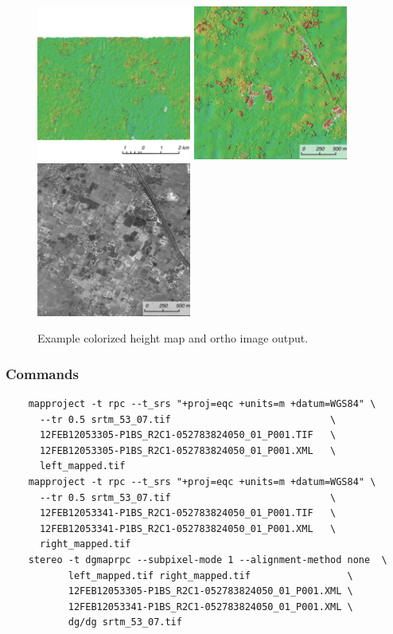 \begin{figure}[h!]
\centering
  \includegraphics[width=2.0in]{images/examples/dg/MappedContext_400px.png}
  \includegraphics[width=2.0in]{images/examples/dg/MappedCloseUp_400px.png}
  \includegraphics[width=2.0in]{images/examples/dg/MappedCloseUpDRG_400px.png}
\caption{Example colorized height map and ortho image output.}
\label{fig:dg-map-example}
\end{figure}

\subsubsection*{Commands}

\begin{verbatim}
    mapproject -t rpc --t_srs "+proj=eqc +units=m +datum=WGS84" \
      --tr 0.5 srtm_53_07.tif                            \
      12FEB12053305-P1BS_R2C1-052783824050_01_P001.TIF   \
      12FEB12053305-P1BS_R2C1-052783824050_01_P001.XML   \
      left_mapped.tif
    mapproject -t rpc --t_srs "+proj=eqc +units=m +datum=WGS84" \
      --tr 0.5 srtm_53_07.tif                            \
      12FEB12053341-P1BS_R2C1-052783824050_01_P001.TIF   \
      12FEB12053341-P1BS_R2C1-052783824050_01_P001.XML   \
      right_mapped.tif
    stereo -t dgmaprpc --subpixel-mode 1 --alignment-method none  \
           left_mapped.tif right_mapped.tif                 \
           12FEB12053305-P1BS_R2C1-052783824050_01_P001.XML \
           12FEB12053341-P1BS_R2C1-052783824050_01_P001.XML \
           dg/dg srtm_53_07.tif
\end{verbatim}

